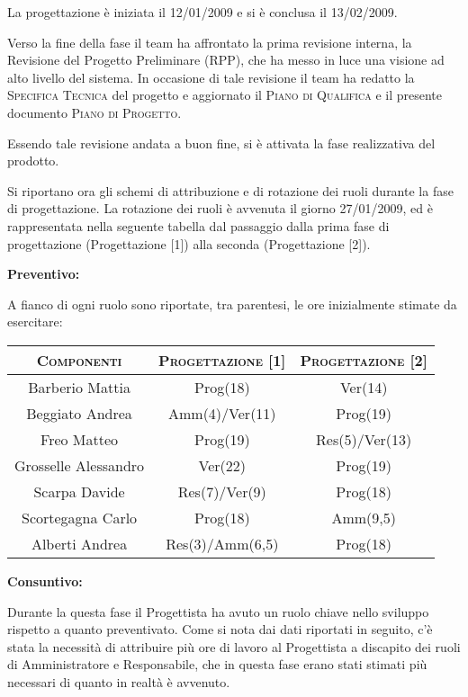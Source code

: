 \documentclass[11pt,a4paper]{article}
\begin{document}
La progettazione è iniziata il 12/01/2009 e si è conclusa il 13/02/2009.

Verso la fine della fase il team ha affrontato la prima revisione interna, la Revisione del Progetto Preliminare (RPP), che ha messo in luce una visione ad alto livello del sistema.
In occasione di tale revisione il team ha redatto la \textsc{Specifica Tecnica} del progetto e aggiornato il \textsc{Piano di Qualifica} e il presente documento \textsc{Piano di Progetto}.

Essendo tale revisione andata a buon fine, si è attivata la fase realizzativa del prodotto.

Si riportano ora gli schemi di attribuzione e di rotazione dei ruoli durante la fase di progettazione.
La rotazione dei ruoli è avvenuta il giorno 27/01/2009, ed è rappresentata nella seguente tabella dal passaggio dalla prima fase di progettazione (Progettazione [1]) alla seconda (Progettazione [2]).

\bigskip \bigskip 
\begin{large}\textbf{Preventivo:}\end{large}
\newline
A fianco di ogni ruolo sono riportate, tra parentesi, le ore inizialmente stimate da esercitare:
\\
\begin{center}
\begin{tabular}{|c||c|c|}
\hline
\textsc{Componenti} & \textsc{Progettazione [1]} & \textsc{Progettazione [2]} \\ \hline \hline
Barberio Mattia & Prog(18) & Ver(14) \\ \hline
Beggiato Andrea & Amm(4)/Ver(11) & Prog(19) \\ \hline
Freo Matteo & Prog(19) & Res(5)/Ver(13) \\ \hline
Grosselle Alessandro & Ver(22) & Prog(19) \\ \hline
Scarpa Davide & Res(7)/Ver(9) & Prog(18) \\ \hline
Scortegagna Carlo & Prog(18) & Amm(9,5) \\ \hline
Alberti Andrea & Res(3)/Amm(6,5) & Prog(18) \\ \hline
\end{tabular}
\end{center}

\bigskip \bigskip 
\begin{large}\textbf{Consuntivo:}\end{large}
\newline
Durante la questa fase il Progettista ha avuto un ruolo chiave nello sviluppo rispetto a quanto preventivato. Come si nota dai dati riportati in seguito, c'è stata la necessità di attribuire più ore di lavoro al Progettista a discapito dei ruoli di Amministratore e Responsabile, che in questa fase erano stati stimati più necessari di quanto in realtà è avvenuto.
\end{document}
